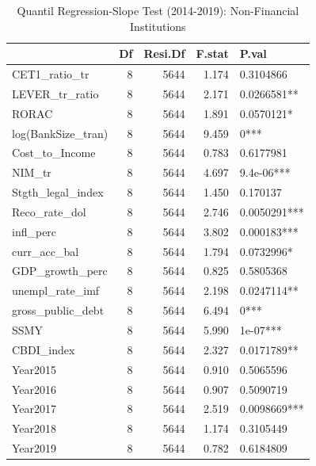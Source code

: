 \begin{table}[ht]
\centering
\caption{Quantil Regression-Slope Test (2014-2019): Non-Financial Institutions} 
\begingroup\small
\begin{tabular}{lrrrl}
  \toprule
 & Df & Resi.Df & F.stat & P.val \\ 
  \midrule
CET1\_ratio\_tr & 8 & 5644 & 1.174 & 0.3104866 \\ 
  LEVER\_tr\_ratio & 8 & 5644 & 2.171 & 0.0266581** \\ 
  RORAC & 8 & 5644 & 1.891 & 0.0570121* \\ 
  log(BankSize\_tran) & 8 & 5644 & 9.459 & 0*** \\ 
  Cost\_to\_Income & 8 & 5644 & 0.783 & 0.6177981 \\ 
  NIM\_tr & 8 & 5644 & 4.697 & 9.4e-06*** \\ 
  Stgth\_legal\_index & 8 & 5644 & 1.450 & 0.170137 \\ 
  Reco\_rate\_dol & 8 & 5644 & 2.746 & 0.0050291*** \\ 
  infl\_perc & 8 & 5644 & 3.802 & 0.000183*** \\ 
  curr\_acc\_bal & 8 & 5644 & 1.794 & 0.0732996* \\ 
  GDP\_growth\_perc & 8 & 5644 & 0.825 & 0.5805368 \\ 
  unempl\_rate\_imf & 8 & 5644 & 2.198 & 0.0247114** \\ 
  gross\_public\_debt & 8 & 5644 & 6.494 & 0*** \\ 
  SSMY & 8 & 5644 & 5.990 & 1e-07*** \\ 
  CBDI\_index & 8 & 5644 & 2.327 & 0.0171789** \\ 
  Year2015 & 8 & 5644 & 0.910 & 0.5065596 \\ 
  Year2016 & 8 & 5644 & 0.907 & 0.5090719 \\ 
  Year2017 & 8 & 5644 & 2.519 & 0.0098669*** \\ 
  Year2018 & 8 & 5644 & 1.174 & 0.3105449 \\ 
  Year2019 & 8 & 5644 & 0.782 & 0.6184809 \\ 
   \bottomrule
\end{tabular}
\endgroup
\end{table}
